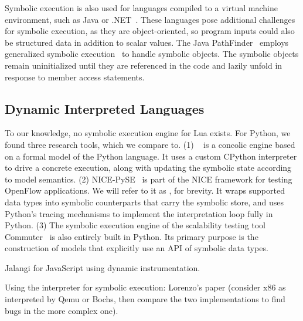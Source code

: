 
Symbolic execution is also used for languages compiled to a virtual machine environment, such as Java or .NET~\cite{jpf-symbex,tillmann-pex}.  These languages pose additional challenges for symbolic execution, as they are object-oriented, so program inputs could also be structured data in addition to scalar values.
%
The Java PathFinder~\cite{visser-jpf,jpf-symbex,jpf-testgen} employs generalized symbolic execution~\cite{generalized-symbex} to handle symbolic objects.  The symbolic objects remain uninitialized until they are referenced in the code and lazily unfold in response to member access statements.

\subsection{Dynamic Interpreted Languages}

To our knowledge, no symbolic execution engine for Lua exists.  For Python, we found three research tools, which we compare \chef to.  (1) \cutiepy~\cite{cutie-py} is a concolic engine based on a formal model of the Python language.  It uses a custom CPython interpreter to drive a concrete execution, along with updating the symbolic state according to model semantics. (2) NICE-PySE~\cite{nice} is part of the NICE framework for testing OpenFlow applications.  We will refer to it as \nicese, for brevity. It wraps supported data types into symbolic counterparts that carry the symbolic store, and uses Python's tracing mechanisms to implement the interpretation loop fully in Python.  (3) The symbolic execution engine of the scalability testing tool Commuter~\cite{commuter} is also entirely built in Python.  Its primary purpose is the construction of models that explicitly use an API of symbolic data types.

Jalangi for JavaScript using dynamic instrumentation.

Using the interpreter for symbolic execution: Lorenzo's paper (consider x86 as interpreted by Qemu or Bochs, then compare the two implementations to find bugs in the more complex one).

